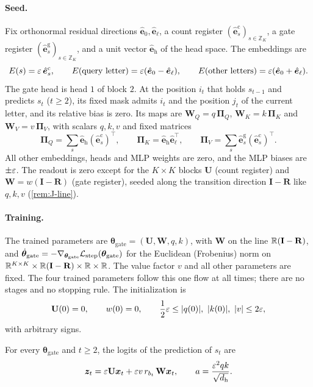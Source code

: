 \paragraph{Seed.} Fix orthonormal residual directions $\hat{\bm e}_0,\hat{\bm e}_\ell$, a count register $(\hat{\bm e}^{\mathrm c}_s)_{s\in\mathbb Z_K}$, a gate register
$(\hat{\bm e}^{\mathrm g}_s)_{s\in\mathbb Z_K}$, and a unit vector $\hat{\bm e}_{\mathrm h}$ of the head space. The embeddings are
\[
 E(s)=\varepsilon\,\hat{\bm e}^{\mathrm c}_s,\qquad E(\text{query letter})=\varepsilon(\hat{\bm e}_0-\hat{\bm e}_\ell),\qquad E(\text{other letters})=\varepsilon(\hat{\bm e}_0+\hat{\bm e}_\ell).
\]
The gate head is head $1$ of block $2$. At the position $i_t$ that holds $s_{t-1}$ and predicts $s_t$ ($t\ge2$), its fixed mask admits
$i_t$ and the position $j_t$ of the current letter, and its relative bias is zero. Its maps are $\mathbf W_Q=q\,\bm\Pi_Q$, $\mathbf W_K=k\,\bm\Pi_K$ and
$\mathbf W_V=v\,\bm\Pi_V$, with scalars $q,k,v$ and fixed matrices
\[
 \bm\Pi_Q=\textstyle\sum_s\hat{\bm e}_{\mathrm h}(\hat{\bm e}^{\mathrm c}_s)^{\!\top},\qquad \bm\Pi_K=\hat{\bm e}_{\mathrm h}\hat{\bm e}_\ell^{\top},\qquad \bm\Pi_V=\sum_s\hat{\bm e}^{\mathrm g}_s(\hat{\bm e}^{\mathrm c}_s)^{\!\top}.
\]
All other embeddings, heads and MLP weights are zero, and the MLP biases are $\pm\varepsilon$. The readout is zero except for the
$K\times K$ blocks $\mathbf U$ (count register) and $\mathbf W=w(\mathbf I-\mathbf R)$ (gate register), seeded along the transition direction
$\mathbf I-\mathbf R$ like $q,k,v$ (\cref{rem:J-line}).

\paragraph{Training.} The trained parameters are $\bm\theta_{\mathrm{gate}}=(\mathbf U,\mathbf W,q,k)$, with $\mathbf W$ on the line $\mathbb R(\mathbf I-\mathbf R)$, and
$\dot{\bm\theta}_{\mathrm{gate}}=-\nabla_{\bm\theta_{\mathrm{gate}}}\mathcal L_{\mathrm{step}}(\bm\theta_{\mathrm{gate}})$ for the Euclidean (Frobenius) norm on $\mathbb R^{K\times K}\times\mathbb R(\mathbf I-\mathbf R)\times\mathbb R\times\mathbb R$. The value factor $v$
and all other parameters are fixed. The four trained parameters follow this one flow at all times; there are no stages and no stopping
rule. The initialization is
\[
 \mathbf U(0)=0,\qquad w(0)=0,\qquad \tfrac{1}{2}\initscale\le|q(0)|,\ |k(0)|,\ |v|\le2\initscale,
\]
with arbitrary signs.

\begin{lemma}
\label{lem:J-features}
For every $\bm\theta_{\mathrm{gate}}$ and $t\ge2$, the logits of the prediction of $s_t$ are
\[
 \bm z_t=\varepsilon \mathbf U\bm x_t+\varepsilon v\,r_{b_t}\,\mathbf W\bm x_t,\qquad a=\frac{\varepsilon^2qk}{\sqrt{d_{\mathrm h}}}.
\]
\end{lemma}

